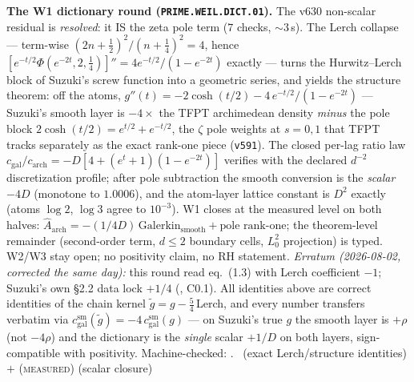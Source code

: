 \documentclass[11pt,a4paper]{article}
\theoremstyle{definition}
\begin{document}
\par\smallskip\noindent\textbf{The W1 dictionary round
(\texttt{PRIME.WEIL.DICT.01}).}
The v630 non-scalar residual is \emph{resolved}: it IS the zeta pole
term ($7$ checks, ${\sim}3$\,s).  The Lerch collapse --- term-wise
$(2n{+}\tfrac12)^2/(n{+}\tfrac14)^2=4$, hence
$[e^{-t/2}\Phi(e^{-2t},2,\tfrac14)]''=4e^{-t/2}/(1-e^{-2t})$ exactly
--- turns the Hurwitz--Lerch block of Suzuki's screw function into a
geometric series, and yields the structure theorem: off the atoms,
$g''(t)=-2\cosh(t/2)-4\,e^{-t/2}/(1-e^{-2t})$ --- Suzuki's smooth
layer is $-4\times$ the TFPT archimedean density \emph{minus} the pole
block $2\cosh(t/2)=e^{t/2}+e^{-t/2}$, the $\zeta$ pole weights at
$s=0,1$ that TFPT tracks separately as the exact rank-one piece
(\texttt{v591}).  The closed per-lag ratio law
$c_{\mathrm{gal}}/c_{\mathrm{arch}}=-D[4+(e^t{+}1)(1-e^{-2t})]$
verifies with the declared $d^{-2}$ discretization profile; after pole
subtraction the smooth conversion is the \emph{scalar} $-4D$
(monotone to $1.0006$), and the atom-layer lattice constant is $D^2$
exactly (atoms $\log2$, $\log3$ agree to $10^{-3}$).  W1 closes at the
measured level on both halves:
$\widehat A_{\mathrm{arch}}=-(1/4D)\,\mathrm{Galerkin}_{\mathrm{smooth}}
+\text{pole rank-one}$; the theorem-level remainder (second-order
term, $d\le2$ boundary cells, $L^2_0$ projection) is typed.  W2/W3
stay open; no positivity claim, no RH statement.
\emph{Erratum (2026-08-02, corrected the same day):} this round read
eq.~(1.3) with Lerch coefficient $-1$; Suzuki's own \S2.2 data lock
$+1/4$ (, C0.1).  All identities above are
correct identities of the chain kernel
$\tilde g=g-\tfrac54\,$Lerch, and every number transfers verbatim via
$c^{\mathrm{sm}}_{\mathrm{gal}}(\tilde g)=-4\,c^{\mathrm{sm}}_{\mathrm{gal}}(g)$
--- on Suzuki's true $g$ the smooth layer is $+\rho$ (not $-4\rho$)
and the dictionary is the \emph{single} scalar $+1/D$ on both layers,
sign-compatible with positivity.
Machine-checked: .
\mE\ (exact Lerch/structure identities) $+$ (\textsc{measured})
(scalar closure)
\par\smallskip
\end{document}
